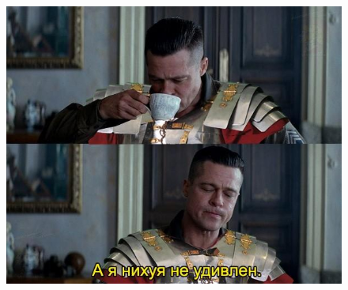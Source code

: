 \begin{figure}[h!tb] 
	\centering\includegraphics[scale=0.6]{LegionsDead/1593599741150795821.png}
\end{figure}